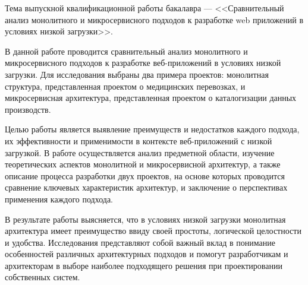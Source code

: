 
Тема выпускной квалификационной работы бакалавра --- <<Сравнительный анализ монолитного и микросервисного подходов к разработке web приложений в условиях низкой загрузки>>.

В данной работе проводится сравнительный анализ монолитного и микросервисного подходов к разработке веб-приложений в условиях низкой загрузки. Для исследования выбраны два примера проектов: монолитная структура, представленная проектом о медицинских перевозках, и микросервисная архитектура, представленная проектом о каталогизации данных производств.

Целью работы является выявление преимуществ и недостатков каждого подхода, их эффективности и применимости в контексте веб-приложений с низкой загрузкой. В работе осуществляется анализ предметной области, изучение теоретических аспектов монолитной и микросервисной архитектур, а также описание процесса разработки двух проектов, на основе которых проводится сравнение ключевых характеристик архитектур, и заключение о перспективах применения каждого подхода.

В результате работы выясняется, что в условиях низкой загрузки монолитная архитектура имеет преимущество ввиду своей простоты, логической целостности и удобства. Исследования представляют собой важный вклад в понимание особенностей различных архитектурных подходов и помогут разработчикам и архитекторам в выборе наиболее подходящего решения при проектировании собственных систем.

\clearpage